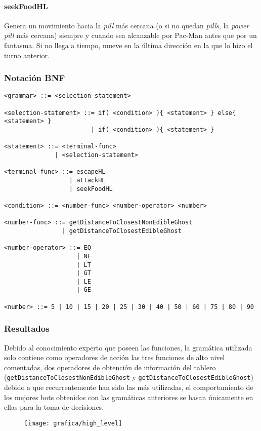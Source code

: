 \paragraph{seekFoodHL}
Genera un movimiento hacia la \textit{pill} más cercana (o si no quedan \textit{pills}, la \textit{power pill} más cercana) siempre y cuando sea alcanzable por Pac-Man antes que por un fantasma. Si no llega a tiempo, mueve en la última dirección en la que lo hizo el turno anterior.

\subsubsection{Notación BNF}
\begin{lstlisting}[frame=single, breaklines=no, basicstyle=\fontsize{10}{11}\ttfamily, caption=Gramática de alto nivel.]
<grammar> ::= <selection-statement>

<selection-statement> ::= if( <condition> ){ <statement> } else{ <statement> }
                        | if( <condition> ){ <statement> }

<statement> ::= <terminal-func>
              | <selection-statement>

<terminal-func> ::= escapeHL
                  | attackHL
                  | seekFoodHL

<condition> ::= <number-func> <number-operator> <number>

<number-func> ::= getDistanceToClosestNonEdibleGhost
                | getDistanceToClosestEdibleGhost

<number-operator> ::= EQ
                    | NE
                    | LT
                    | GT
                    | LE
                    | GE

<number> ::= 5 | 10 | 15 | 20 | 25 | 30 | 40 | 50 | 60 | 75 | 80 | 90
\end{lstlisting}

\subsubsection{Resultados}
Debido al conocimiento experto que poseen las funciones, la gramática utilizada solo contiene como operadores de acción las tres funciones de alto nivel comentadas, dos operadores de obtención de información del tablero  (\texttt{getDistanceToClosestNonEdibleGhost} y \texttt{getDistanceToClosestEdibleGhost}) debido a que recurrentemente han sido las más utilizadas, el comportamiento de los mejores bots obtenidos con las gramáticas anteriores se basan únicamente en ellas para la toma de decisiones.
\begin{figure}[H]
\centering
\texttt{[image: grafica/high\_level]}
\end{figure}

